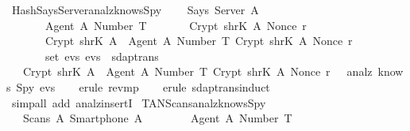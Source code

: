 \begin{isabellebody}
  \isamarkupfalse%
  \endisatagproof
  {\isafoldproof}%
  \isadelimproof
  \isanewline
  \endisadelimproof
  \isanewline
  \isamarkupfalse%
  \ Hash{\isacharunderscore}Says{\isacharunderscore}Server{\isacharunderscore}analz{\isacharunderscore}knows{\isacharunderscore}Spy\ {\isacharcolon}\isanewline
  \ \ {\isachardoublequoteopen}{\isasymlbrakk}\ Says\ Server\ A\ {\isasymlbrace}\isanewline
  \ \ \ \ \ \ \ {\isasymlbrace}Agent\ A{\isacharcomma}\ Number\ T{\isasymrbrace}{\isacharcomma}\isanewline
  \ \ \ \ \ \ \ Crypt\ {\isacharparenleft}shrK\ A{\isacharparenright}\ {\isacharparenleft}Nonce\ r{\isacharparenright}{\isacharcomma}\isanewline
  \ \ \ \ \ \ \ Crypt\ {\isacharparenleft}shrK\ A{\isacharparenright}\ {\isasymlbrace}\ {\isasymlbrace}Agent\ A{\isacharcomma}\ Number\ T{\isasymrbrace}{\isacharcomma}\ Crypt\ {\isacharparenleft}shrK\ A{\isacharparenright}\ {\isacharparenleft}Nonce\ r{\isacharparenright}\ {\isasymrbrace}\isanewline
  \ \ \ \ \ {\isasymrbrace}\ {\isasymin}\ set\ evs{\isacharsemicolon}\ evs\ {\isasymin}\ sdaptrans\ {\isasymrbrakk}\isanewline
  \ \ {\isasymLongrightarrow}\ Crypt\ {\isacharparenleft}shrK\ A{\isacharparenright}\ {\isasymlbrace}\ {\isasymlbrace}Agent\ A{\isacharcomma}\ Number\ T{\isasymrbrace}{\isacharcomma}\ Crypt\ {\isacharparenleft}shrK\ A{\isacharparenright}\ {\isacharparenleft}Nonce\ r{\isacharparenright}\ {\isasymrbrace}\ {\isasymin}\ analz\ {\isacharparenleft}knows\ Spy\ evs{\isacharparenright}{\isachardoublequoteclose}\isanewline
  \isadelimproof
  \isanewline
  \ \ %
  \endisadelimproof
  \isatagproof
  \isamarkupfalse%
  \ {\isacharparenleft}erule\ rev{\isacharunderscore}mp{\isacharparenright}\isanewline
  \ \ \isamarkupfalse%
  \ {\isacharparenleft}erule\ sdaptrans{\isachardot}induct{\isacharparenright}\isanewline
  \ \ \isamarkupfalse%
  \ {\isacharparenleft}simp{\isacharunderscore}all\ add{\isacharcolon}\ analz{\isacharunderscore}insertI{\isacharparenright}\isanewline
  \isamarkupfalse%
  \endisatagproof
  {\isafoldproof}%
  \isadelimproof
  \isanewline
  \endisadelimproof
  \isanewline
  \isamarkupfalse%
  \ TAN{\isacharunderscore}Scans{\isacharunderscore}analz{\isacharunderscore}knows{\isacharunderscore}Spy\ {\isacharcolon}\isanewline
  \ \ {\isachardoublequoteopen}{\isasymlbrakk}\ Scans\ A\ {\isacharparenleft}Smartphone\ A{\isacharparenright}\ {\isasymlbrace}\isanewline
  \ \ \ \ \ \ \ {\isasymlbrace}Agent\ A{\isacharcomma}\ Number\ T{\isasymrbrace}{\isacharcomma}\isanewline

\end{isabellebody}
